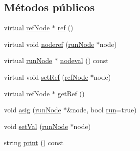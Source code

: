 \subsection*{Métodos públicos}
\begin{DoxyCompactItemize}
\item 
virtual \hyperlink{classrefNode}{ref\-Node} $\ast$ \hyperlink{classnexpNode_a9cfb7bb942f2c522cd43cd4cf344796e}{ref} ()
\item 
virtual void \hyperlink{classnexpNode_aa6dbcdd4ab3cbde54e944fc04891652f}{noderef} (\hyperlink{classrunNode}{run\-Node} $\ast$node)
\item 
virtual \hyperlink{classrunNode}{run\-Node} $\ast$ \hyperlink{classnexpNode_a964e408c8f55df1aa02269087914e538}{nodeval} () const 
\item 
virtual void \hyperlink{classnexpNode_a98b2fe44e5704b444c85d5c081f392ec}{set\-Ref} (\hyperlink{classrefNode}{ref\-Node} $\ast$node)
\item 
virtual \hyperlink{classrefNode}{ref\-Node} $\ast$ \hyperlink{classnexpNode_a5fde05f8b5ae65645b06cae3be20b449}{get\-Ref} ()
\item 
void \hyperlink{classnexpNode_a9d84683887ea9e00b2c2e85aa8484073}{asig} (\hyperlink{classrunNode}{run\-Node} $\ast$\&node, bool \hyperlink{classrunNode_a83c10df8148829b08e04153c93d69eec}{run}=true)
\item 
void \hyperlink{classnexpNode_a34ab900122b2790d5f5893c033ed333a}{set\-Val} (\hyperlink{classrunNode}{run\-Node} $\ast$node)
\item 
string \hyperlink{classnexpNode_a123e568513157222f0faf89c1e415b4f}{print} () const 
\end{DoxyCompactItemize}

